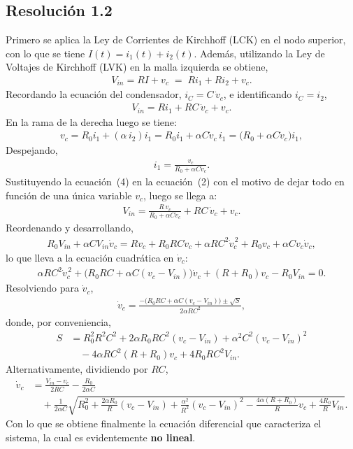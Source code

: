 \documentclass[
  11pt,
  letterpaper,
   addpoints,
   answers
  ]{exam}
\begin{document}
\begin{questions}
\begin{solution}
\subsection*{Resolución 1.2}
Primero se aplica la Ley de Corrientes de Kirchhoff (LCK) en el nodo superior, con lo que se tiene \(I(t)=i_1(t)+i_2(t)\). Además, utilizando la Ley de Voltajes de Kirchhoff (LVK) en la malla izquierda se obtiene,
\begin{align}
V_{in}=RI+v_c \;=\; R i_1 + R i_2 + v_c .
\end{align}
Recordando la ecuación del condensador, \(i_C=C\,\dot v_c\), e identificando \(i_C=i_2\),
\begin{align}
V_{in}=R i_1 + RC\,\dot v_c + v_c .
\end{align}
En la rama de la derecha luego se tiene:
\begin{align}
v_c = R_0 i_1 + (\alpha\, i_2) i_1
    = R_0 i_1 + \alpha C \dot v_c\, i_1
    = \bigl(R_0 + \alpha C \dot v_c \bigr) i_1,
\end{align}
Despejando,
\begin{align}
i_1=\frac{v_c}{R_0+\alpha C \dot v_c}.
\end{align}
Sustituyendo la ecuación~(4) en la ecuación~(2) con el motivo de dejar todo en función de una única variable \(v_{c}\), luego se llega a:
\begin{align}
V_{in}= \frac{R\,v_c}{R_0+\alpha C \dot v_c} + RC\,\dot v_c + v_c .
\end{align}
Reordenando y desarrollando,
\begin{align}
R_0 V_{in}+ \alpha C V_{in}\dot v_c
= Rv_c + R_0 RC \dot v_c + \alpha RC^2 \dot v_c^{\,2} + R_0 v_c + \alpha C v_c \dot v_c ,
\end{align}
lo que lleva a la ecuación cuadrática en \(\dot v_c\):
\begin{align}
\alpha RC^2 \dot v_c^{\,2} + \bigl(R_0RC + \alpha C (v_c - V_{in})\bigr)\dot v_c
+ (R+R_0) v_c - R_0 V_{in} = 0.
\end{align}
Resolviendo para \(\dot v_c\),
\begin{align}
\dot v_c
= \frac{-\bigl(R_0RC + \alpha C (v_c - V_{in})\bigr) \pm \sqrt{S}}
       {2\alpha RC^2},
\end{align}
donde, por conveniencia,
\begin{align}
S
&= R_0^2 R^2 C^2
+ 2\alpha R_0 R C^2 (v_c - V_{in})
+ \alpha^2 C^2 (v_c - V_{in})^2 \nonumber\\
&\quad - 4\alpha R C^2 (R+R_0) v_c
+ 4 R_0 R C^2 V_{in}.
\end{align}
Alternativamente, dividiendo por \(RC\),
\begin{align}
\dot v_c
&= \frac{V_{in}-v_c}{2RC} - \frac{R_0}{2\alpha C} \nonumber\\
&\quad + \frac{1}{2\alpha C}\sqrt{
  R_0^2 + \frac{2\alpha R_0}{R}(v_c - V_{in})
  + \frac{\alpha^2}{R^2}(v_c - V_{in})^2
  - \frac{4\alpha (R+R_0)}{R} v_c + \frac{4R_0}{R}V_{in} } .
\end{align}
Con lo que se obtiene finalmente la ecuación diferencial que caracteriza el sistema, la cual es evidentemente \textbf{no lineal}.

\end{solution}
\end{questions}
\end{document}
